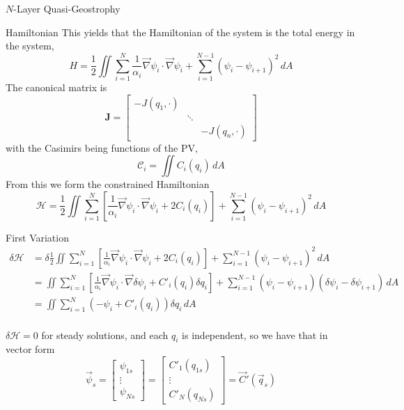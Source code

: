 \documentclass[12pt]{article}
\begin{document}
\begin{section}{$N$-Layer Quasi-Geostrophy}
\begin{subsection}{Hamiltonian}
        This yields that the Hamiltonian of the system is the total energy in the system,
        $$
        H = \frac12 \iint \sum_{i=1}^N \frac{1}{\alpha_i}\vec\nabla \psi_i \cdot \vec\nabla \psi_i + \sum_{i=1}^{N-1} (\psi_i - \psi_{i+1})^2 \, dA
        $$
        The canonical matrix is
        $$
        \mathbf{J} = \left[\begin{array}{ccc}
        -J(q_1, \cdot) & & \\
        & \ddots & \\
        & & -J(q_n, \cdot)
        \end{array}\right]
        $$
        with the Casimirs being functions of the PV,
        $$
        \mathcal{C}_i = \iint C_i(q_i) \, dA
        $$
        From this we form the constrained Hamiltonian
        \begin{equation}
        \mathcal{H} = \frac12 \iint \sum_{i=1}^N \left[ \frac{1}{\alpha_i} \vec\nabla \psi_i \cdot \vec\nabla \psi_i + 2C_i(q_i) \right] + \sum_{i=1}^{N-1} (\psi_i - \psi_{i+1})^2 \, dA
        \label{eqn:qg_Nl_h}
        \end{equation}
    \end{subsection}

    \begin{subsection}{First Variation}
        \begin{align*}
        \delta \mathcal{H} &= \delta\frac12 \iint \sum_{i=1}^N \left[ \frac{1}{\alpha_i} \vec\nabla \psi_i \cdot \vec\nabla \psi_i + 2C_i(q_i) \right] + \sum_{i=1}^{N-1} (\psi_i - \psi_{i+1})^2 \, dA \\
        &= \iint \sum_{i=1}^N \left[ \frac{1}{\alpha_i} \vec\nabla \psi_i \cdot \vec\nabla \delta\psi_i + C'_i(q_i) \delta q_i \right]+ \sum_{i=1}^{N-1} (\psi_i - \psi_{i+1})(\delta \psi_i - \delta \psi_{i+1}) \, dA \\
        &= \iint \sum_{i=1}^N (-\psi_i + C'_i(q_i)) \delta q_i\, dA \\
        \end{align*}

        $\delta \mathcal{H} = 0$ for steady solutions, and each $q_i$ is independent, so we have that in vector form
        \begin{equation}
        \vec \psi_s =
        \left[\begin{array}{c}
        \psi_{1s} \\
        \vdots \\
        \psi_{Ns}
        \end{array}\right]
        =
        \left[\begin{array}{c}
        C'_1(q_{1s}) \\
        \vdots \\
        C'_N(q_{Ns})
        \end{array}\right]
        =
        \vec C'(\vec q_s)
        \end{equation}
    \end{subsection}


\end{section}
\end{document}
